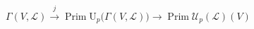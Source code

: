 \(\displaystyle
\Gamma(V,\mathcal L)
  \xrightarrow{j}
\operatorname{Prim}\mathrm U_p\!\bigl(\Gamma(V,\mathcal L)\bigr)
  \longrightarrow
\operatorname{Prim}\mathcal U_p(\mathcal L)(V)
\)

